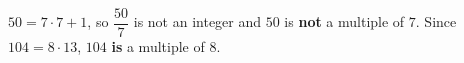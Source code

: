$50=7\cdot7+1$, so $\dfrac{50}{7}$ is not an integer and $50$ is \textbf{not} a multiple of $7$. Since $104=8\cdot13$, $104$ \textbf{is} a multiple of $8$.
